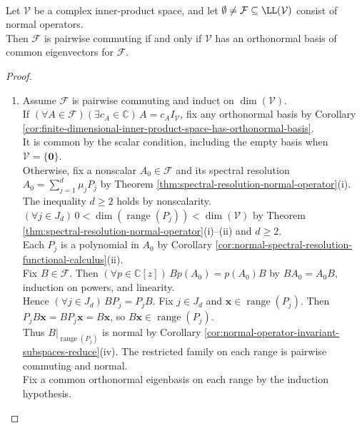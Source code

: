 \begin{theorem} \label{thm:simultaneous-unitary-diagonalization-normal-family} \\
Let $\mathcal{V}$ be a complex inner-product space, and let $\emptyset\neq\mathcal{F}\subseteq\LL(\mathcal{V})$ consist of normal operators.\\
Then $\mathcal{F}$ is pairwise commuting if and only if $\mathcal{V}$ has an orthonormal basis of common eigenvectors for $\mathcal{F}$.
\begin{proof}
\begin{enumerate}[label=\roman*.]
\setlength{\itemsep}{0pt}
\item[$(\Rightarrow)$] Assume $\mathcal{F}$ is pairwise commuting and induct on $\dim(\mathcal{V})$.\\
If $(\forall A\in\mathcal{F})(\exists c_A\in\mathbb{C})\,A=c_AI_{\mathcal{V}}$, fix any orthonormal basis by Corollary \ref{cor:finite-dimensional-inner-product-space-has-orthonormal-basis}.\\
It is common by the scalar condition, including the empty basis when $\mathcal{V}=\{\mathbf{0}\}$.\\
Otherwise, fix a nonscalar $A_0\in\mathcal{F}$ and its spectral resolution $A_0=\sum\limits_{j=1}^{d}\mu_jP_j$ by Theorem \ref{thm:spectral-resolution-normal-operator}(i).\\
The inequality $d\geq2$ holds by nonscalarity. $(\forall j\in J_d)\,0<\dim(\operatorname{range}(P_j))<\dim(\mathcal{V})$ by Theorem \ref{thm:spectral-resolution-normal-operator}(i)--(ii) and $d\geq2$.\\
Each $P_j$ is a polynomial in $A_0$ by Corollary \ref{cor:normal-spectral-resolution-functional-calculus}(ii).\\
Fix $B\in\mathcal{F}$. Then $(\forall p\in\mathbb{C}[z])\,Bp(A_0)=p(A_0)B$ by $BA_0=A_0B$, induction on powers, and linearity.\\
Hence $(\forall j\in J_d)\,BP_j=P_jB$. Fix $j\in J_d$ and $\mathbf{x}\in\operatorname{range}(P_j)$. Then $P_jB\mathbf{x}=BP_j\mathbf{x}=B\mathbf{x}$, so $B\mathbf{x}\in\operatorname{range}(P_j)$.\\
Thus $B|_{\operatorname{range}(P_j)}$ is normal by Corollary \ref{cor:normal-operator-invariant-subspaces-reduce}(iv). The restricted family on each range is pairwise commuting and normal.\\
Fix a common orthonormal eigenbasis on each range by the induction hypothesis.\\

\end{enumerate}
\end{proof}
\end{theorem}
